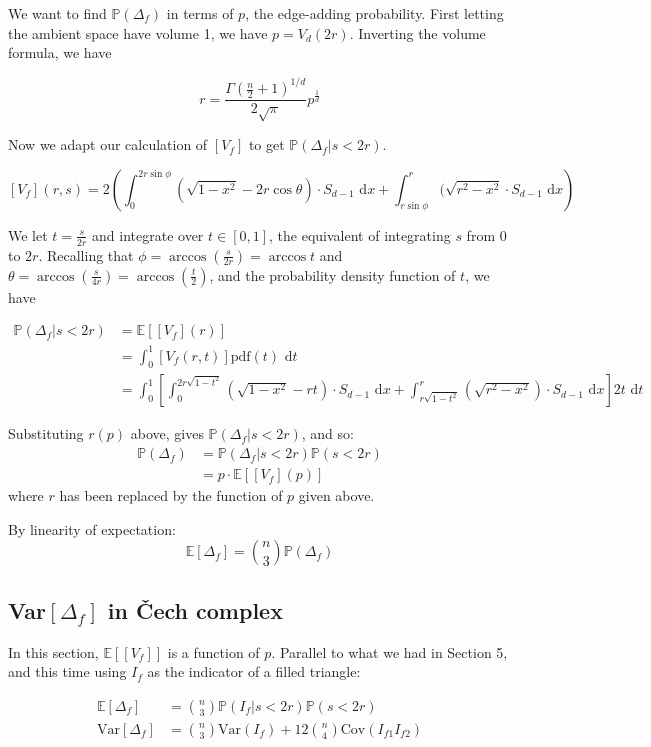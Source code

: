 \documentclass[11pt]{article}
\theoremstyle{definition}
\renewcommand{\P}{\mathbb{P}} %
\newcommand{\E}{\mathbb{E}}
\begin{document}
We want to find $\P(\Delta_f)$ in terms of $p$, the edge-adding probability. First letting the ambient space have volume 1, we have $p = V_d(2r)$. Inverting the volume formula, we have  

$$
r = \frac{\Gamma(\frac{n}{2}+1)^{1/d}}{2\sqrt{\pi}}p^\frac{1}{d}
$$

Now we adapt our calculation of $[V_f]$ to get $\P(\Delta_f | s < 2r)$.

$$
[V_f](r,s) = 2\left(\int_0^{2r\sin\phi}(\sqrt{1-x^2}-2r\cos\theta)\cdot S_{d-1} \text{ d}x + \int_{r\sin\phi}^r(\sqrt{r^2-x^2}\cdot S_{d-1}\text{ d}x \right)
$$

We let $t = \frac{s}{2r}$ and integrate over $t \in [0,1]$, the equivalent of integrating $s$ from $0$ to $2r$. Recalling that $\phi = \arccos (\frac{s}{2r}) = \arccos t$ and $\theta = \arccos (\frac{s}{4r}) = \arccos (\frac{t}{2})$, and the probability density function of $t$, we have 

$$
\begin{aligned}
\P(\Delta_f | s < 2r) &= \E[[V_f](r)] \\
&= \int_0^1 \left[ V_f(r,t) \right] \text{pdf}(t) \text{ d}t \\
&= \int_0^1 \left[ \int_0^{2r\sqrt{1-t^2}} \left( \sqrt{1-x^2} - rt \right) \cdot S_{d-1} \text{ d}x + \int_{r\sqrt{1-t^2}}^r \left( \sqrt{r^2-x^2} \right) \cdot S_{d-1} \text{ d}x \right] 2t \text{ d}t
\end{aligned}
$$

Substituting $r(p)$ above, gives $\P(\Delta_f | s<2r)$, and so:
$$
\begin{aligned}
\P(\Delta_f) &= \P(\Delta_f | s<2r)\P(s<2r) \\
&= p \cdot \E[[V_f](p)]  
\end{aligned}
$$
where $r$ has been replaced by the function of $p$ given above. 

By linearity of expectation:
$$
\E[\Delta_f]= {n \choose 3} \P(\Delta_f)
$$

\subsection{Var$[\Delta_f]$ in Čech complex}

In this section, $\E[[V_f]]$ is a function of $p$. Parallel to what we had in Section 5, and this time using $I_f$ as the indicator of a filled triangle:

$$
\begin{aligned}
\mathbb{E}[\Delta_f] &= {n \choose 3} \P(I_f | s<2r)\P(s<2r) \\
\mathrm{Var}[\Delta_f] &= {n \choose 3} \mathrm{Var}(I_f) + 12 {n \choose 4} \mathrm{Cov}(I_{f1}I_{f2}) 
\end{aligned}
$$
\end{document}

